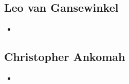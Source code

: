 \subsection{Leo van Gansewinkel}
\begin{itemize}
 \item 
\end{itemize}

\subsection{Christopher Ankomah}
\begin{itemize}
 \item 
\end{itemize}

